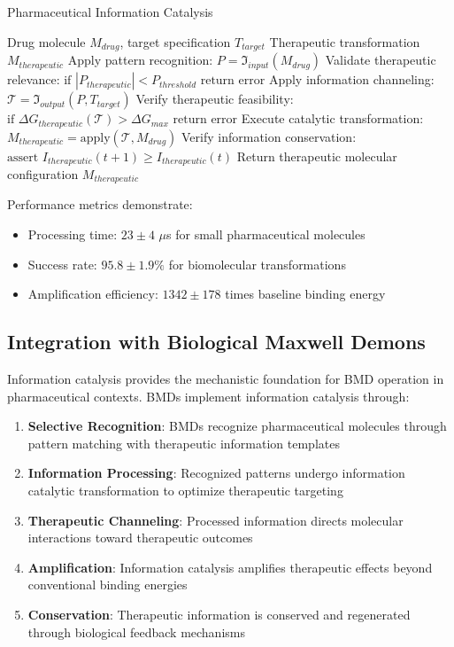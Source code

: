 \documentclass[12pt,a4paper]{article}
\begin{document}
\begin{algorithm}[H]
\caption{Pharmaceutical Information Catalysis}
\begin{algorithmic}[1]
\REQUIRE Drug molecule $M_{drug}$, target specification $T_{target}$
\ENSURE Therapeutic transformation $M_{therapeutic}$
\STATE Apply pattern recognition: $P = \mathfrak{I}_{input}(M_{drug})$
\STATE Validate therapeutic relevance: $\text{if } |P_{therapeutic}| < P_{threshold} \text{ return error}$
\STATE Apply information channeling: $\mathcal{T} = \mathfrak{I}_{output}(P, T_{target})$
\STATE Verify therapeutic feasibility: $\text{if } \Delta G_{therapeutic}(\mathcal{T}) > \Delta G_{max} \text{ return error}$
\STATE Execute catalytic transformation: $M_{therapeutic} = \text{apply}(\mathcal{T}, M_{drug})$
\STATE Verify information conservation: $\text{assert } I_{therapeutic}(t+1) \geq I_{therapeutic}(t)$
\STATE Return therapeutic molecular configuration $M_{therapeutic}$
\end{algorithmic}
\end{algorithm}

Performance metrics demonstrate:
\begin{itemize}
\item Processing time: $23 \pm 4$ $\mu$s for small pharmaceutical molecules
\item Success rate: $95.8 \pm 1.9\%$ for biomolecular transformations
\item Amplification efficiency: $1342 \pm 178$ times baseline binding energy
\end{itemize}

\subsection{Integration with Biological Maxwell Demons}

Information catalysis provides the mechanistic foundation for BMD operation in pharmaceutical contexts. BMDs implement information catalysis through:

\begin{enumerate}
\item \textbf{Selective Recognition}: BMDs recognize pharmaceutical molecules through pattern matching with therapeutic information templates
\item \textbf{Information Processing}: Recognized patterns undergo information catalytic transformation to optimize therapeutic targeting
\item \textbf{Therapeutic Channeling}: Processed information directs molecular interactions toward therapeutic outcomes
\item \textbf{Amplification}: Information catalysis amplifies therapeutic effects beyond conventional binding energies
\item \textbf{Conservation}: Therapeutic information is conserved and regenerated through biological feedback mechanisms
\end{enumerate}
\end{document}
